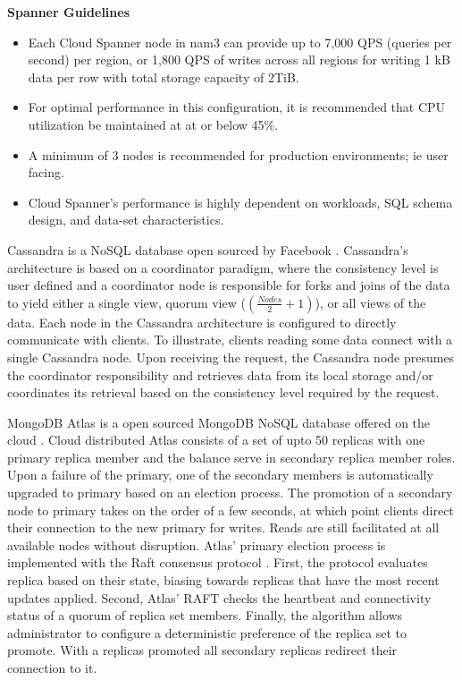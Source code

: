 \documentclass[conference]{IEEEtran}
\begin{document}
\textbf{Spanner Guidelines}
\begin{itemize}
 \item Each Cloud Spanner node in nam3 can provide up to 7,000 QPS (queries per second) per region, or 1,800 QPS of writes across all regions for writing 1 kB data per row with total storage capacity of 2TiB.
 \item For optimal performance in this configuration, it is recommended that CPU utilization be maintained at at or below 45\%.
 \item A minimum of 3 nodes is recommended for production environments; ie user facing.
 \item Cloud Spanner's performance is highly dependent on workloads, SQL schema design, and data-set characteristics. 
\end{itemize}

Cassandra is a NoSQL database open sourced by Facebook \cite{Cassandra}. Cassandra's architecture is based on a coordinator paradigm, where the consistency level is user defined and a coordinator node is responsible for forks and joins of the data to yield either a single view, quorum view ($(\frac{Nodes}{2} +1)$), or all views of the data. Each node in the Cassandra architecture is configured to directly communicate with clients. To illustrate, clients reading some data connect with a single Cassandra node. Upon receiving the request, the Cassandra node presumes the coordinator responsibility and retrieves data from its local storage and/or coordinates its retrieval based on the consistency level required by the request.

MongoDB Atlas is a open sourced MongoDB NoSQL database offered on the cloud \cite{Mongo}. Cloud distributed Atlas consists of a set of upto 50 replicas with one primary replica member and the balance serve in secondary replica member roles. Upon a failure of the primary, one of the secondary members is automatically upgraded to primary based on an election process. The promotion of a secondary node to primary takes on the order of a few seconds, at which point clients direct their connection to the new primary for writes. Reads are still facilitated at all available nodes without disruption. Atlas' primary election process is implemented with the Raft consensus protocol \cite{raft}. First, the protocol evaluates replica based on their state, biasing towards replicas that have the most recent updates applied. Second, Atlas' RAFT checks the heartbeat and connectivity status of a quorum of replica set members. Finally, the algorithm allows administrator to configure a deterministic preference of the replica set to promote. With a replicas promoted all secondary replicas redirect their connection to it. 
\end{document}
